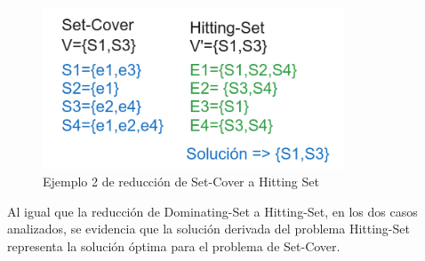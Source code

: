 \begin{figure}[H]
    \centering
    \includegraphics[width=0.8\textwidth]{img/ejemplo2_SC-HS.png}
    \caption{Ejemplo 2 de reducción de Set-Cover a Hitting Set}
    \label{fig:ejemplo2_DS-HS}
\end{figure}

Al igual que la reducción de Dominating-Set a Hitting-Set, en los dos casos analizados, se evidencia que la solución derivada del problema Hitting-Set representa la solución óptima para el problema de Set-Cover.




